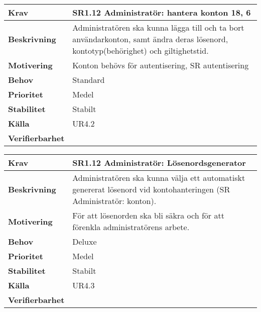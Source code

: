 \documentclass[a4paper, twoside, 11pt, titlepage]{article}
\begin{document}
	\begin{tabular} { p{2.6cm} p{12.5cm} }
		\hline
		\sffamily\textbf{Krav} & \sffamily\textbf{SR1.12 Administratör: hantera konton 18, 6 } \\
		\hline
		\sffamily\textbf{Beskrivning} & Administratören ska kunna lägga till och ta bort användarkonton, samt ändra deras lösenord, kontotyp(behörighet) och giltighetstid.  \\
		\hline
		\sffamily\textbf{Motivering} & Konton behövs för autentisering, SR autentisering  \\
		\hline
		\sffamily\textbf{Behov} & Standard  \\
		\hline
		\sffamily\textbf{Prioritet} & Medel  \\
		\hline
		\sffamily\textbf{Stabilitet} & Stabilt  \\
		\hline
		\sffamily\textbf{Källa} & UR4.2  \\
		\hline
		\sffamily\textbf{Verifierbarhet} &   \\
		\hline
	\end{tabular}
	\vspace{6mm}

	\begin{tabular} { p{2.6cm} p{12.5cm} }
		\hline
		\sffamily\textbf{Krav} & \sffamily\textbf{SR1.12 Administratör: Lösenordsgenerator } \\
		\hline
		\sffamily\textbf{Beskrivning} & Administratören ska kunna välja ett automatiskt genererat lösenord vid kontohanteringen (SR Administratör: konton).  \\
		\hline
		\sffamily\textbf{Motivering} & För att lösenorden ska bli säkra och för att förenkla administratörens arbete.  \\
		\hline
		\sffamily\textbf{Behov} & Deluxe  \\
		\hline
		\sffamily\textbf{Prioritet} & Medel  \\
		\hline
		\sffamily\textbf{Stabilitet} & Stabilt  \\
		\hline
		\sffamily\textbf{Källa} & UR4.3  \\
		\hline
		\sffamily\textbf{Verifierbarhet} &   \\
		\hline
	\end{tabular}
	\vspace{6mm}
\end{document}
